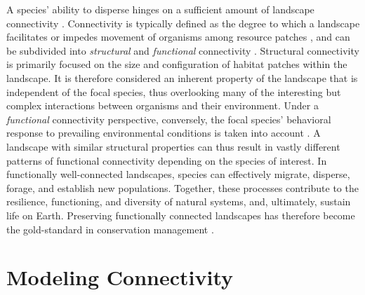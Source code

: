 \documentclass[../FinalThesis.tex]{subfiles}
\begin{document}
A species' ability to disperse hinges on a sufficient amount of landscape
connectivity \citep{Doerr.2011}. Connectivity is typically defined as the degree
to which a landscape facilitates or impedes movement of organisms among resource
patches \citep{Taylor.1993}, and can be subdivided into \textit{structural} and
\textit{functional} connectivity \citep{Tischendorf.2000}. Structural
connectivity is primarily focused on the size and configuration of habitat
patches within the landscape. It is therefore considered an inherent property of
the landscape that is independent of the focal species, thus overlooking many of
the interesting but complex interactions between organisms and their
environment. Under a \textit{functional} connectivity perspective, conversely,
the focal species' behavioral response to prevailing environmental conditions is
taken into account \citep{Tischendorf.2000}. A landscape with similar structural
properties can thus result in vastly different patterns of functional
connectivity depending on the species of interest. In functionally
well-connected landscapes, species can effectively migrate, disperse, forage,
and establish new populations. Together, these processes contribute to the
resilience, functioning, and diversity of natural systems, and, ultimately,
sustain life on Earth. Preserving functionally connected landscapes has
therefore become the gold-standard in conservation management
\citep{Heller.2009, Doerr.2011, Rudnick.2012}.

\section{Modeling Connectivity}
\end{document}
